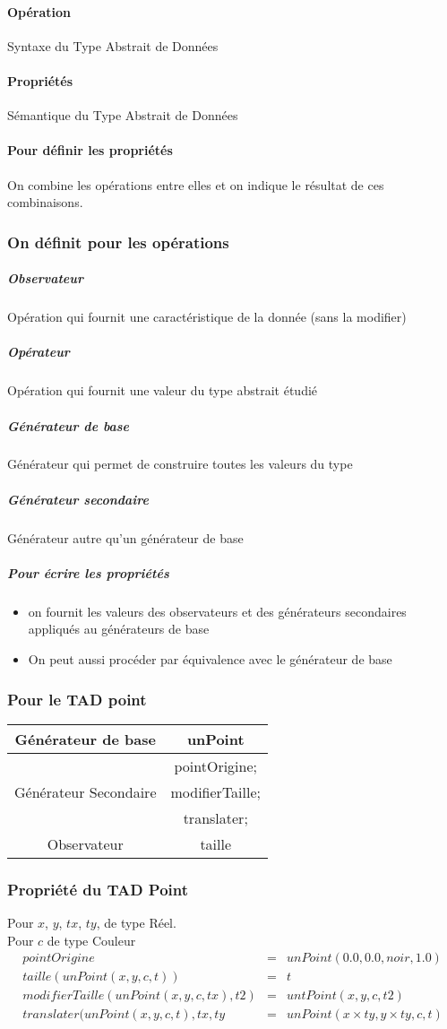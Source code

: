 		\paragraph{Opération} Syntaxe du Type Abstrait de Données
		\paragraph{Propriétés} Sémantique du Type Abstrait de Données
		\paragraph{Pour définir les propriétés} On combine les opérations entre elles et on indique le résultat de ces combinaisons.
		\subsubsection{On définit pour les opérations}
				
			\subparagraph{Observateur} Opération qui fournit une caractéristique de la donnée (sans la modifier)
			\subparagraph{Opérateur} Opération qui fournit une valeur du type abstrait étudié
			\subparagraph{Générateur de base} Générateur qui permet de construire toutes les valeurs du type
			\subparagraph{Générateur secondaire} Générateur autre qu'un générateur de base
			\subparagraph{Pour écrire les propriétés}
				\begin{itemize}
					\item on fournit les valeurs des observateurs et des générateurs secondaires appliqués au générateurs de base
					\item On peut aussi procéder par équivalence avec le générateur de base
				\end{itemize}
			\subsubsection{Pour le TAD point}
				\begin{tabular}{c|c}
					Générateur de base & unPoint\\
					\hline
										  & pointOrigine;\\
					Générateur Secondaire & modifierTaille;\\
										  & translater;\\
					\hline
					Observateur & taille
				\end{tabular}
			
			\subsubsection{Propriété du TAD Point}
				Pour $x$, $y$, $tx$, $ty$, de type Réel.\\
				Pour $c$ de type Couleur\\
				\begin{eqnarray}
					pointOrigine&=&unPoint(0.0, 0.0, noir, 1.0)\\	
					taille(unPoint(x, y, c, t))&=&t\\
					modifierTaille(unPoint(x,y,c,tx),t2)&=&untPoint(x,y,c,t2)\\
					translater(unPoint(x,y,c,t),tx,ty&=&unPoint(x \times ty, y \times ty, c, t)
				\end{eqnarray}
